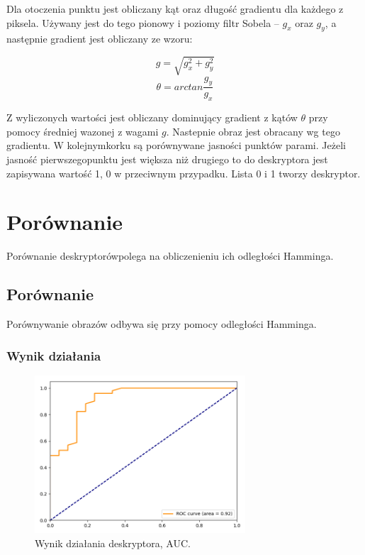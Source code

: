 \documentclass[a4paper,11pt]{article}
\begin{document}
Dla otoczenia punktu jest obliczany kąt oraz długość gradientu dla każdego z piksela. Używany jest do tego pionowy i poziomy filtr Sobela -- $g_x$ oraz $g_y$, a następnie gradient jest obliczany ze wzoru:

$$ g = \sqrt{g_x^2 + g_y^2}$$
$$ \theta =arctan \frac{g_y}{g_x}$$

Z wyliczonych wartości jest obliczany dominujący gradient z kątów $\theta$ przy pomocy średniej wazonej z wagami $g$. Nastepnie obraz jest obracany wg tego gradientu. W kolejnymkorku są porównywane jasności punktów parami. Jeżeli jasność pierwszegopunktu jest większa niż drugiego to do deskryptora jest zapisywana wartość 1, 0 w przeciwnym przypadku. Lista 0 i 1 tworzy deskryptor.

\section{Porównanie}

Porównanie deskryptorówpolega na obliczenieniu ich odległości Hamminga.

\subsection{Porównanie}
Porównywanie obrazów odbywa się przy pomocy odległości Hamminga.


\subsubsection{Wynik działania}

\begin{figure}[H]
\begin{center}
\includegraphics[width=0.7\textwidth]{./img/brief.png}
\end{center}
\caption{Wynik działania deskryptora, AUC.}
\end{figure}
\end{document}
